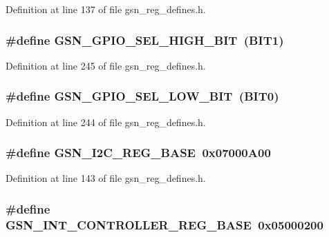 Definition at line 137 of file gsn\_\-reg\_\-defines.h.

\hypertarget{a00546_a217d8012431ebcdd4791f4e1a4aabc72}{
\subsubsection[{GSN\_\-GPIO\_\-SEL\_\-HIGH\_\-BIT}]{\setlength{\rightskip}{0pt plus 5cm}\#define GSN\_\-GPIO\_\-SEL\_\-HIGH\_\-BIT~(BIT1)}}
\label{a00546_a217d8012431ebcdd4791f4e1a4aabc72}


Definition at line 245 of file gsn\_\-reg\_\-defines.h.

\hypertarget{a00546_a10c97d83066ca170009edcfea8dc2d8b}{
\subsubsection[{GSN\_\-GPIO\_\-SEL\_\-LOW\_\-BIT}]{\setlength{\rightskip}{0pt plus 5cm}\#define GSN\_\-GPIO\_\-SEL\_\-LOW\_\-BIT~(BIT0)}}
\label{a00546_a10c97d83066ca170009edcfea8dc2d8b}


Definition at line 244 of file gsn\_\-reg\_\-defines.h.

\hypertarget{a00546_ad30eba94a4b22f73aaf2c4629d0aa33d}{
\subsubsection[{GSN\_\-I2C\_\-REG\_\-BASE}]{\setlength{\rightskip}{0pt plus 5cm}\#define GSN\_\-I2C\_\-REG\_\-BASE~0x07000A00}}
\label{a00546_ad30eba94a4b22f73aaf2c4629d0aa33d}


Definition at line 143 of file gsn\_\-reg\_\-defines.h.

\hypertarget{a00546_a7ef63e25b2923428a8540d2ba731001f}{
\subsubsection[{GSN\_\-INT\_\-CONTROLLER\_\-REG\_\-BASE}]{\setlength{\rightskip}{0pt plus 5cm}\#define GSN\_\-INT\_\-CONTROLLER\_\-REG\_\-BASE~0x05000200}}
\label{a00546_a7ef63e25b2923428a8540d2ba731001f}



